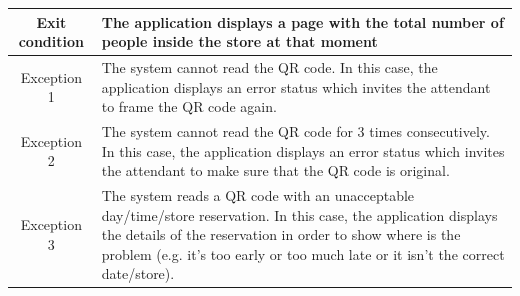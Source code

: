 \documentclass[table, 12pt]{article}
\begin{document}
\begin{longtable}{|c| p{10cm}|}
    \hline
    Exit condition   & The application displays a page with the total number of people inside the store at that moment
    \\
    \hline
    \hline
    Exception 1      & The system cannot read the QR code. In this case, the application displays an error status which invites the attendant to frame the QR code again.                                                                                                                 \\
    \hline
    Exception 2      & The system cannot read the QR code for 3 times consecutively. In this case, the application displays an error status which invites the attendant to make sure that the QR code is original.                                                                        \\
    \hline
    Exception 3      & The system reads a QR code with an unacceptable day/time/store reservation. In this case, the application displays the details of the reservation in order to show where is the problem (e.g. it's too early or too much late or it isn't the correct date/store). \\
    \hline
\end{longtable}
\end{document}
